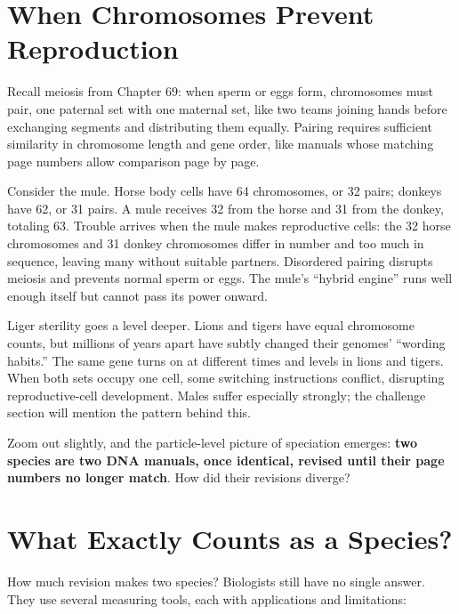 \section{When Chromosomes Prevent Reproduction}

Recall meiosis from Chapter 69: when sperm or eggs form, chromosomes must pair, one paternal set with one maternal set, like two teams joining hands before exchanging segments and distributing them equally. Pairing requires sufficient similarity in chromosome length and gene order, like manuals whose matching page numbers allow comparison page by page.

Consider the mule. Horse body cells have 64 chromosomes, or 32 pairs; donkeys have 62, or 31 pairs. A mule receives 32 from the horse and 31 from the donkey, totaling 63. Trouble arrives when the mule makes reproductive cells: the 32 horse chromosomes and 31 donkey chromosomes differ in number and too much in sequence, leaving many without suitable partners. Disordered pairing disrupts meiosis and prevents normal sperm or eggs. The mule's ``hybrid engine'' runs well enough itself but cannot pass its power onward.

Liger sterility goes a level deeper. Lions and tigers have equal chromosome counts, but millions of years apart have subtly changed their genomes' ``wording habits.'' The same gene turns on at different times and levels in lions and tigers. When both sets occupy one cell, some switching instructions conflict, disrupting reproductive-cell development. Males suffer especially strongly; the challenge section will mention the pattern behind this.

Zoom out slightly, and the particle-level picture of speciation emerges: \textbf{two species are two DNA manuals, once identical, revised until their page numbers no longer match}. How did their revisions diverge?

\section{What Exactly Counts as a Species?}

How much revision makes two species? Biologists still have no single answer. They use several measuring tools, each with applications and limitations:

